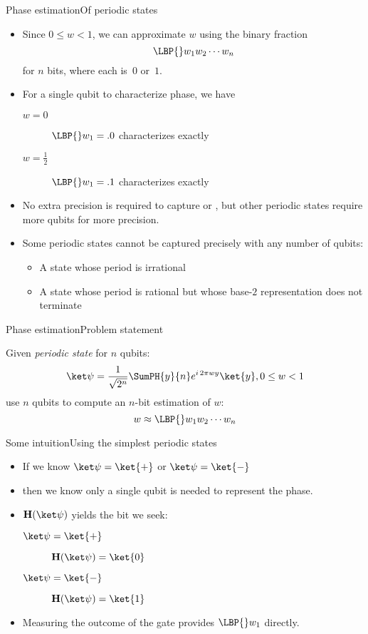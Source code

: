 \begin{frame}{Phase estimation}{Of periodic states}

\begin{itemize}[<+->]
    \item Since $0\leq w < 1$, we can approximate $w$ using the binary fraction
    \[ \LBP{}w_{1}w_{2}\cdots w_{n}\]
    for $n$ bits, where each is~$0$ or~$1$.
    \item For a single qubit to characterize phase, we have
    \begin{description}
        \item[$w=0$]  $\LBP{}w_{1}=.0$ characterizes \ket{+} exactly
        \item[$w=\frac{1}{2}$] $\LBP{}w_{1}=.1$ characterizes \ket{-} exactly
    \end{description}
    \item No extra precision is required to capture \ket{+} or \ket{-}, but other periodic states require more qubits for more precision.
    \item Some periodic states cannot be captured precisely with any number of qubits:
    \begin{itemize}
        \item A state whose period is irrational
        \item A state whose period is rational but whose base-$2$ representation does not terminate
    \end{itemize}
\end{itemize}
    
\end{frame}

\begin{frame}{Phase estimation}{Problem statement}

Given \emph{periodic state} \QState{} for $n$ qubits: 
\[
\QState{} = \RootTwoN{n}\SumPH{y}{n} \ExpPhase{2\pi wy} \ket{y},  0 \leq w < 1
\]
use $n$ qubits to compute an $n$-bit estimation of $w$:
\[
w \approx \LBP{}w_{1}w_{2}\cdots w_{n} 
\]
    
\end{frame}

\begin{frame}{Some intuition}{Using the simplest periodic states}

\begin{itemize}[<+->]
    \item If we know $\QState{}=\ket{+}$ or $\QState{}=\ket{-}$
    \item then we know only a single qubit is needed to represent the phase.
    \item $\Hadamard(\QState{})$ yields the bit we seek:
    \begin{description}
        \item[$\QState{}=\ket{+}$] $\Hadamard(\QState{}) = \ket{0}$
        \item[$\QState{}=\ket{-}$] $\Hadamard(\QState{}) = \ket{1}$
    \end{description}
    \item Measuring the outcome of the \Hadamard{} gate provides $\LBP{}w_{1}$ directly.
    \end{itemize}
    \end{frame}
    
